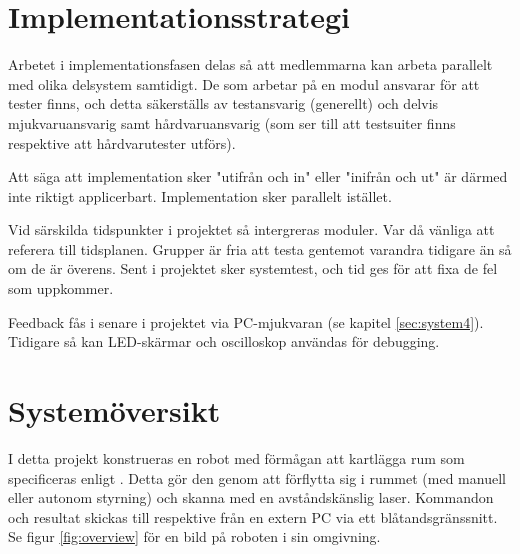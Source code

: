 \documentclass[a4paper,11pt]{article}
\begin{document}
\pagestyle{intro}
\LIPStitelsida
\clearpage
\begin{LIPSprojektidentitet}
\end{LIPSprojektidentitet}

\clearpage
\renewcommand{\familydefault}{\sfdefault}	%
\normalfont
\tableofcontents
\renewcommand{\familydefault}{\rmdefault}	%
\normalfont
\clearpage
\begin{LIPSdokumenthistorik}
\end{LIPSdokumenthistorik}
\clearpage
\setcounter{page}{1}
\pagestyle{content}

\section{Implementationsstrategi}
Arbetet i implementationsfasen delas så att medlemmarna kan arbeta parallelt med olika delsystem samtidigt. De som arbetar på en modul ansvarar för att tester finns, och detta säkerställs av testansvarig (generellt) och delvis mjukvaruansvarig samt hårdvaruansvarig (som ser till att testsuiter finns respektive att hårdvarutester utförs).

Att säga att implementation sker "utifrån och in" eller "inifrån och ut" är därmed inte riktigt applicerbart. Implementation sker parallelt istället.

Vid särskilda tidspunkter i projektet så intergreras moduler. Var då vänliga att referera till tidsplanen. Grupper är fria att testa gentemot varandra tidigare än så om de är överens. Sent i projektet sker systemtest, och tid ges för att fixa de fel som uppkommer.

Feedback fås i senare i projektet via PC-mjukvaran (se kapitel \ref{sec:system4}). Tidigare så kan LED-skärmar och oscilloskop användas för debugging.


\section{Systemöversikt}
I detta projekt konstrueras en robot med förmågan att kartlägga rum som specificeras enligt \cite{coursespec}. Detta gör den genom att förflytta sig i rummet (med manuell eller autonom styrning) och skanna med en avståndskänslig laser. Kommandon och resultat skickas till respektive från en extern PC via ett blåtandsgränssnitt. Se figur \ref{fig:overview} för en bild på roboten i sin omgivning.
\end{document}
